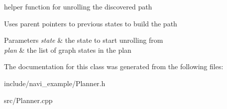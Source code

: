 helper function for unrolling the discovered path 

\-Uses parent pointers to previous states to build the path


\begin{DoxyParams}{\-Parameters}
{\em state} & the state to start unrolling from \\
\hline
{\em plan} & the list of graph states in the plan \\
\hline
\end{DoxyParams}


\-The documentation for this class was generated from the following files\-:\begin{DoxyCompactItemize}
\item 
include/navi\-\_\-example/\-Planner.\-h\item 
src/\-Planner.\-cpp\end{DoxyCompactItemize}
